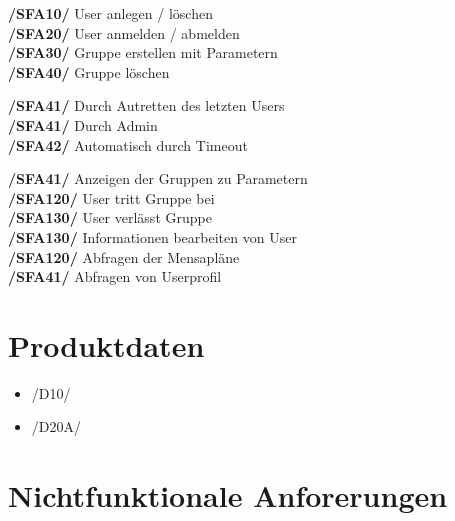 \documentclass[a4paper]{scrreprt}
\begin{document}
\begin{addmargin}[25pt]{0pt} 
\textbf{/SFA10/} User anlegen / löschen\\
\textbf{/SFA20/} User anmelden / abmelden\\
\textbf{/SFA30/} Gruppe erstellen mit Parametern\\
\textbf{/SFA40/} Gruppe löschen\\
	\begin{addmargin}[25pt]{0pt} 
	\textbf{/SFA41/} Durch Autretten des letzten Users\\
	\textbf{/SFA41/} Durch Admin\\
	\textbf{/SFA42/} Automatisch durch Timeout\\
	\end{addmargin}
\textbf{/SFA41/} Anzeigen der Gruppen zu Parametern\\
\textbf{/SFA120/} User tritt Gruppe bei\\
\textbf{/SFA130/} User verlässt Gruppe\\
\textbf{/SFA130/} Informationen bearbeiten von User\\
\textbf{/SFA120/} Abfragen der Mensapläne\\
\textbf{/SFA41/} Abfragen von Userprofil\\
\end{addmargin}

\chapter{Produktdaten}
\begin{itemize}
\item /D10/ 
\item /D20A/
\end{itemize}

\chapter{Nichtfunktionale Anforerungen}
\end{document}
